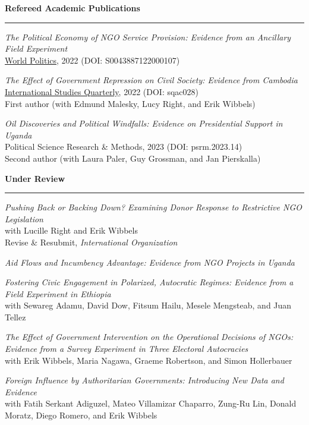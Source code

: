 \documentclass[11pt]{article}
\begin{document}
\textbf{\large Refereed Academic Publications}\\
\rule[3mm]{\textwidth}{.2pt}
{\sl The Political Economy of NGO Service Provision: Evidence from an Ancillary Field Experiment}\\
\href{https://www.cambridge.org/core/journals/world-politics/article/abs/political-economy-of-ngo-service-provision/D5265B6C0EA842B788BCB309EF4E5178}{World Politics}, 2022 (DOI: S0043887122000107)

{\sl The Effect of Government Repression on Civil Society: Evidence from Cambodia}\\
\href{https://academic.oup.com/isq/article-abstract/66/3/sqac028/6631078?redirectedFrom=fulltext&login=false}{International Studies Quarterly}, 2022 (DOI: sqac028)\\
First author (with Edmund Malesky, Lucy Right, and Erik Wibbels)

{\sl Oil Discoveries and Political Windfalls: Evidence on Presidential Support in Uganda}\\
Political Science Research \& Methods, 2023 (DOI: psrm.2023.14)\\
Second author (with Laura Paler, Guy Grossman, and Jan Pierskalla)

\textbf{\large Under Review}\\
\rule[3mm]{\textwidth}{.2pt}
{\sl Pushing Back or Backing Down? Examining Donor Response to Restrictive NGO Legislation}\\
with Lucille Right and Erik Wibbels\\
Revise \& Resubmit, \textit{International Organization}

{\sl Aid Flows and Incumbency Advantage: Evidence from NGO Projects in Uganda}

{\sl Fostering Civic Engagement in Polarized, Autocratic Regimes: Evidence from a Field Experiment in Ethiopia}\\
with Sewareg Adamu, David Dow, Fitsum Hailu, Mesele Mengsteab, and Juan Tellez

{\sl The Effect of Government Intervention on the Operational Decisions of NGOs: Evidence from a Survey Experiment in Three Electoral Autocracies}\\
with Erik Wibbels, Maria Nagawa, Graeme Robertson, and Simon Hollerbauer

{\sl Foreign Influence by Authoritarian Governments: Introducing New Data and Evidence}\\
with Fatih Serkant Adiguzel, Mateo Villamizar Chaparro, Zung-Ru Lin, Donald Moratz, Diego Romero, and Erik Wibbels
\end{document}
